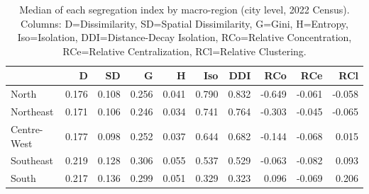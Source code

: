 \begin{table}
\caption{Median of each segregation index by macro-region (city level, 2022 Census). Columns: D=Dissimilarity, SD=Spatial Dissimilarity, G=Gini, H=Entropy, Iso=Isolation, DDI=Distance-Decay Isolation, RCo=Relative Concentration, RCe=Relative Centralization, RCl=Relative Clustering.}
\label{tab:regional}
\begin{tabular}{lrrrrrrrrr}
\toprule
 & D & SD & G & H & Iso & DDI & RCo & RCe & RCl \\
\midrule
North & 0.176 & 0.108 & 0.256 & 0.041 & 0.790 & 0.832 & -0.649 & -0.061 & -0.058 \\
Northeast & 0.171 & 0.106 & 0.246 & 0.034 & 0.741 & 0.764 & -0.303 & -0.045 & -0.065 \\
Centre-West & 0.177 & 0.098 & 0.252 & 0.037 & 0.644 & 0.682 & -0.144 & -0.068 & 0.015 \\
Southeast & 0.219 & 0.128 & 0.306 & 0.055 & 0.537 & 0.529 & -0.063 & -0.082 & 0.093 \\
South & 0.217 & 0.136 & 0.299 & 0.051 & 0.329 & 0.323 & 0.096 & -0.069 & 0.206 \\
\bottomrule
\end{tabular}
\end{table}
